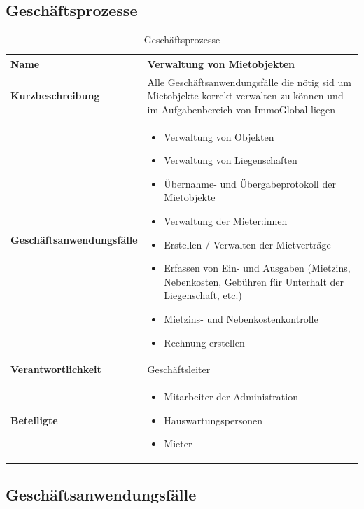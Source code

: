 \subsection{Geschäftsprozesse}
\begin{table}[H]
  \centering
  \settowidth{}
  \setlength\extrarowheight{2pt}
  \begin{tabulary}{1.0\textwidth}{|a|m{12cm}|}
    \hline
    \textbf{Name}& Verwaltung von Mietobjekten \\
    \hline 
    \textbf{Kurzbeschreibung} & Alle Geschäftsanwendungsfälle die nötig sid um Mietobjekte korrekt verwalten zu können und im Aufgabenbereich von ImmoGlobal liegen\\
    \hline
    \textbf{Geschäftsanwendungsfälle} & 
    \begin{itemize}
      \item Verwaltung von Objekten
      \item Verwaltung von Liegenschaften
      \item Übernahme- und Übergabeprotokoll der Mietobjekte
      \item Verwaltung der Mieter:innen
      \item Erstellen / Verwalten der Mietverträge
      \item Erfassen von Ein- und Ausgaben  (Mietzins, Nebenkosten, Gebühren für Unterhalt der Liegenschaft, etc.)
      \item Mietzins- und Nebenkostenkontrolle
      \item Rechnung erstellen
    \end{itemize}\\
    \hline
    \textbf{Verantwortlichkeit} & Geschäftsleiter\\
    \hline
    \textbf{Beteiligte} & 
    \begin{itemize}
      \item Mitarbeiter der Administration
      \item Hauswartungspersonen
      \item Mieter
    \end{itemize}\\
    \hline
  \end{tabulary}
  \caption{Geschäftsprozesse}
\end{table}


\subsection{Geschäftsanwendungsfälle}

\newpage
